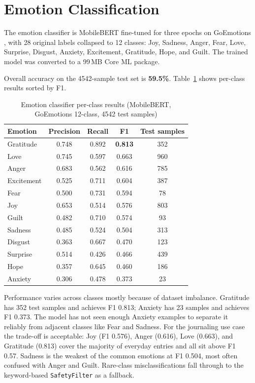 \section{Emotion Classification}
\label{sec:emotion}

The emotion classifier is MobileBERT \cite{sun2020mobilebert} fine-tuned for three epochs on GoEmotions \cite{demszky2020goemotions}, with 28 original labels collapsed to 12 classes: Joy, Sadness, Anger, Fear, Love, Surprise, Disgust, Anxiety, Excitement, Gratitude, Hope, and Guilt. The trained model was converted to a 99\,MB Core ML package.

Overall accuracy on the 4542-sample test set is \textbf{59.5\%}. Table~\ref{tab:emotion_results} shows per-class results sorted by F1.

\begin{table}[h]
\centering
\caption{Emotion classifier per-class results (MobileBERT, GoEmotions 12-class, 4542 test samples)}
\label{tab:emotion_results}
\begin{tabular}{|l|c|c|c|c|}
\hline
\textbf{Emotion} & \textbf{Precision} & \textbf{Recall} & \textbf{F1} & \textbf{Test samples} \\
\hline
Gratitude  & 0.748 & 0.892 & \textbf{0.813} & 352 \\
Love       & 0.745 & 0.597 & 0.663          & 960 \\
Anger      & 0.683 & 0.562 & 0.616          & 785 \\
Excitement & 0.525 & 0.711 & 0.604          & 387 \\
Fear       & 0.500 & 0.731 & 0.594          &  78 \\
Joy        & 0.653 & 0.514 & 0.576          & 803 \\
Guilt      & 0.482 & 0.710 & 0.574          &  93 \\
Sadness    & 0.485 & 0.524 & 0.504          & 313 \\
Disgust    & 0.363 & 0.667 & 0.470          & 123 \\
Surprise   & 0.514 & 0.426 & 0.466          & 439 \\
Hope       & 0.357 & 0.645 & 0.460          & 186 \\
Anxiety    & 0.306 & 0.478 & 0.373          &  23 \\
\hline
\end{tabular}
\end{table}

Performance varies across classes mostly because of dataset imbalance. Gratitude has 352 test samples and achieves F1 0.813; Anxiety has 23 samples and achieves F1 0.373. The model has not seen enough Anxiety examples to separate it reliably from adjacent classes like Fear and Sadness. For the journaling use case the trade-off is acceptable: Joy (F1 0.576), Anger (0.616), Love (0.663), and Gratitude (0.813) cover the majority of everyday entries and all sit above F1 0.57. Sadness is the weakest of the common emotions at F1 0.504, most often confused with Anger and Guilt. Rare-class misclassifications fall through to the keyword-based \texttt{SafetyFilter} as a fallback.

